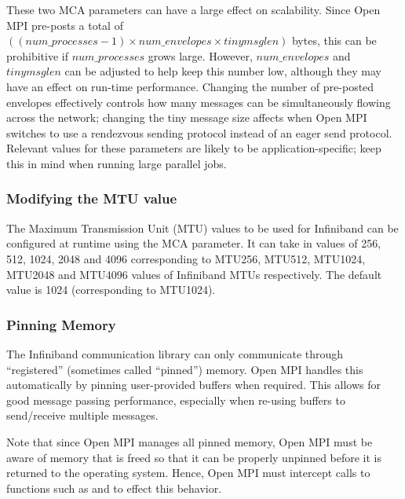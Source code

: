
These two MCA parameters can have a large effect on scalability.
Since Open MPI pre-posts a total of $((num\_processes - 1) \times
num\_envelopes \times tinymsglen)$ bytes, this can be prohibitive if
$num\_processes$ grows large.  However, $num\_envelopes$ and
$tinymsglen$ can be adjusted to help keep this number low, although
they may have an effect on run-time performance.  Changing the number
of pre-posted envelopes effectively controls how many messages can be
simultaneously flowing across the network; changing the tiny message
size affects when Open MPI switches to use a rendezvous sending protocol
instead of an eager send protocol.  Relevant values for these
parameters are likely to be application-specific; keep this in mind
when running large parallel jobs.



\subsubsection{Modifying the MTU value}
\label{sec:mca-ompi-ib-mtu}


The Maximum Transmission Unit (MTU) values to be used for Infiniband
can be configured at runtime using the
 MCA parameter. It can take in
values of 256, 512, 1024, 2048 and 4096 corresponding to MTU256,
MTU512, MTU1024, MTU2048 and MTU4096 values of Infiniband MTUs
respectively. The default value is 1024 (corresponding to MTU1024).



\subsubsection{Pinning Memory}
\label{sec:mca-ompi-ib-ptmalloc}

The Infiniband communication library can only communicate through
``registered'' (sometimes called ``pinned'') memory.  Open MPI handles
this automatically by pinning user-provided buffers when required.
This allows for good message passing performance, especially when
re-using buffers to send/receive multiple messages.

Note that since Open MPI manages all pinned memory, Open MPI must be
aware of memory that is freed so that it can be properly unpinned
before it is returned to the operating system.  Hence, Open MPI must
intercept calls to functions such as  and 
to effect this behavior.


